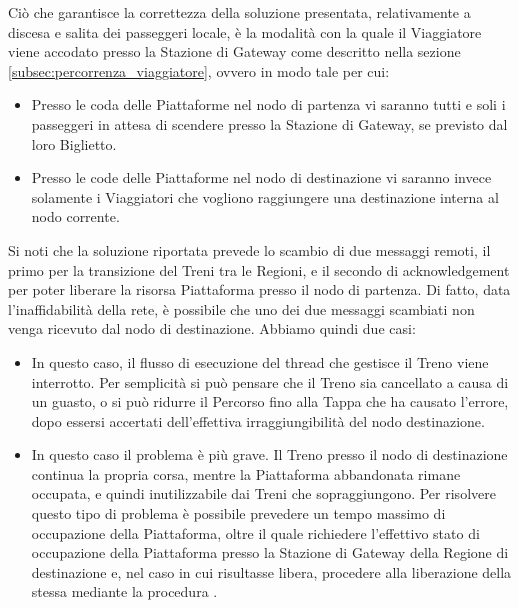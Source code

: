 	Ciò che garantisce la correttezza della soluzione presentata, relativamente a discesa e salita dei passeggeri locale, è la modalità con la quale il Viaggiatore viene accodato presso la Stazione di Gateway come descritto nella sezione \ref{subsec:percorrenza_viaggiatore}, ovvero in modo tale per cui:
	\begin{itemize}
		\item Presso le coda  delle Piattaforme nel nodo di partenza vi saranno tutti e soli i passeggeri in attesa di scendere presso la Stazione di Gateway, se previsto dal loro Biglietto.
		\item Presso le code  delle Piattaforme nel nodo di destinazione vi saranno invece solamente i Viaggiatori che vogliono raggiungere una destinazione interna al nodo corrente.
	\end{itemize}  
	Si noti che la soluzione riportata prevede lo scambio di due messaggi remoti, il primo per la transizione del Treni tra le Regioni, e il secondo di acknowledgement per poter liberare la risorsa Piattaforma presso il nodo di partenza. Di fatto, data l'inaffidabilità della rete, è possibile che uno dei due messaggi scambiati non venga ricevuto dal nodo di destinazione. Abbiamo quindi due casi:
		\begin{itemize}
			\item {} In questo caso, il flusso di esecuzione del thread che gestisce il Treno viene interrotto. Per semplicità si può pensare che il Treno sia cancellato a causa di un guasto, o si può ridurre il Percorso fino alla Tappa che ha causato l'errore, dopo essersi accertati dell'effettiva irraggiungibilità del nodo destinazione.
			\item {} In questo caso il problema è più grave. Il Treno presso il nodo di destinazione continua la propria corsa, mentre la Piattaforma abbandonata rimane occupata, e quindi inutilizzabile dai Treni che sopraggiungono. Per risolvere questo tipo di problema è possibile prevedere un tempo massimo di occupazione della Piattaforma, oltre il quale richiedere l'effettivo stato di occupazione della Piattaforma presso la Stazione di Gateway della Regione di destinazione e, nel caso in cui risultasse libera, procedere alla liberazione della stessa mediante la procedura .
		\end{itemize}
	 
	
